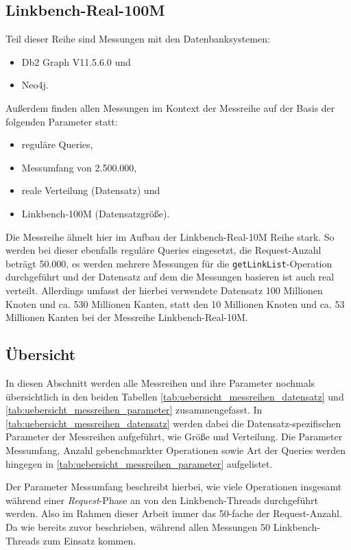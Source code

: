 \subsection{Linkbench-Real-100M}
Teil dieser Reihe sind Messungen mit den Datenbanksystemen:
\begin{itemize}
    \item Db2 Graph V11.5.6.0 und 
    \item Neo4j. 
\end{itemize}

Außerdem finden allen Messungen im Kontext der Messreihe auf der Basis der folgenden Parameter statt:
\begin{itemize}
    \item reguläre Queries,
    \item Messumfang von 2.500.000,
    \item reale Verteilung (Datensatz) und
    \item Linkbench-100M (Datensatzgröße).
\end{itemize}
Die Messreihe ähnelt hier im Aufbau der Linkbench-Real-10M Reihe stark. So werden bei dieser ebenfalls reguläre Queries eingesetzt, die Request-Anzahl beträgt 50.000, es werden mehrere Messungen für die \texttt{getLinkList}-Operation durchgeführt und der Datensatz auf dem die Messungen basieren ist auch real verteilt. Allerdings umfasst der hierbei verwendete Datensatz 100 Millionen Knoten und ca. 530 Millionen Kanten, statt den 10 Millionen Knoten und ca. 53 Millionen Kanten bei der Messreihe Linkbench-Real-10M.

\subsection{Übersicht}
In diesen Abschnitt werden alle Messreihen und ihre Parameter nochmals übersichtlich in den beiden Tabellen \autoref{tab:uebersicht_messreihen_datensatz} und \autoref{tab:uebersicht_messreihen_parameter} zusammengefasst. In \autoref{tab:uebersicht_messreihen_datensatz} werden dabei die Datensatz-spezifischen Parameter der Messreihen aufgeführt, wie Größe und Verteilung. Die Parameter Messumfang, Anzahl gebenchmarkter Operationen sowie Art der Queries werden hingegen in \autoref{tab:uebersicht_messreihen_parameter} aufgelistet.

Der Parameter Messumfang beschreibt hierbei, wie viele Operationen insgesamt während einer \textit{Request}-Phase an von den Linkbench-Threads durchgeführt werden. Also im Rahmen dieser Arbeit immer das 50-fache der Request-Anzahl. Da wie bereits zuvor beschrieben, während allen Messungen 50 Linkbench-Threads zum Einsatz kommen. 

